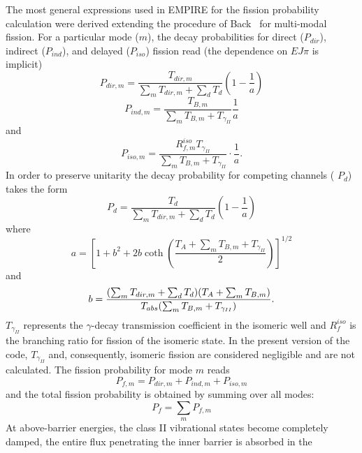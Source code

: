 The most general expressions used in EMPIRE for the fission probability
calculation were derived extending the procedure of Back~\cite{Back:74} for
multi-modal fission. For a particular mode ($m$), the decay probabilities
for direct ($P_{dir}$), indirect ($P_{ind}$), and delayed ($P_{iso}$)
fission read (the dependence on $EJ\pi$ is implicit)
\begin{equation}
P_{dir,m}=\frac{T_{dir,m}}{\sum_{m}T_{dir,m}+\sum_{d}T_{d}}\left(1-\frac{1}{a%
}\right)
\end{equation}
\begin{equation}
P_{ind,m}=\frac{T_{B,m}}{\sum_{m}T_{B,m}+T_{\gamma_{II}}}\frac{1}{a}
\end{equation}
and
\begin{equation}
P_{iso,m}=\frac{R_{f,m}^{iso}T_{\gamma_{II}}}{\sum_{m}T_{B,m}+T_{\gamma_{II}}%
}\cdot\frac{1}{a}.
\end{equation}
In order to preserve unitarity the decay probability for competing channels (%
$P_{d}$) takes the form
\begin{equation}
P_{d}=\frac{T_{d}}{\sum_{m}T_{dir,m}+\sum_{d}T_{d}}\left(1-\frac{1}{a}\right)
\end{equation}
\noindent where
\begin{equation*}
a=\left[1+b^{2}+2b\coth\left(\frac{T_{A}+\sum_{m}T_{B,m}+T_{\gamma_{II}}}{2}%
\right)\right]^{1/2}
\end{equation*}
and
\begin{equation*}
b=\frac{(\sum_{m}T_{dir,m}+\sum_{d}T_{d})(T_{A}+\sum_{m}T_{B,m})}{%
T_{abs}(\sum_{m}T_{B,m}+T_{\gamma_{II}})}.
\end{equation*}
$T_{\gamma_{II}}$ represents the $\gamma$-decay transmission coefficient in the
isomeric well and $R_{f}^{iso}$ is the branching ratio for fission of the
isomeric state. In the present version of the code, $T_{\gamma_{II}}$ and,
consequently, isomeric%
 fission are considered negligible and are not
calculated. The fission probability for mode $m$ reads
\begin{equation}
P_{f,m}=P_{dir,m}+P_{ind,m}+P_{iso,m}
\end{equation}
and the total fission probability is obtained by summing over all modes:
\begin{equation}
P_{f}=\sum_{m}P_{f,m}
\end{equation}
At above-barrier energies, the class II vibrational states become completely
damped, the entire flux penetrating the inner barrier is absorbed in the
